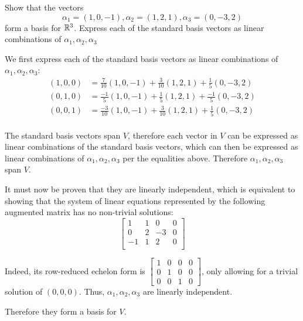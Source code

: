 \documentclass[a4paper, 11pt]{article}
\begin{document}
\begin{problem} 
Show that the vectors \[
    \alpha_1 = (1, 0, -1), \alpha_2 = (1, 2, 1), \alpha_3 = (0, -3, 2)
\]
form a basis for \(\mathbb{R}^3\). Express each of the standard basis vectors as linear combinations of \(\alpha_1, \alpha_2, \alpha_3\)
\end{problem}
\begin{solution}
    We first express each of the standard basis vectors as linear combinations of \(\alpha_1, \alpha_2, \alpha_3\):
    \begin{align*}
        (1, 0, 0) & = \frac{7}{10} (1, 0, -1) + \frac{3}{10} (1, 2, 1) + \frac{1}{5} (0, -3, 2)  \\
        (0, 1, 0) & = \frac{-1}{5} (1, 0, -1) + \frac{1}{5} (1, 2, 1) + \frac{-1}{5} (0, -3, 2)  \\
        (0, 0, 1) & = \frac{-3}{10} (1, 0, -1) + \frac{3}{10} (1, 2, 1) + \frac{1}{5} (0, -3, 2) \\
    \end{align*}

    The standard basis vectors span \(V\), therefore each vector in \(V\) can be expressed as linear combinations of the standard basis vectors, which can then be expressed as linear combinations of \(\alpha_1, \alpha_2, \alpha_3\) per the equalities above. Therefore \(\alpha_1, \alpha_2, \alpha_3\) span \(V\).

    It must now be proven that they are linearly independent, which is equivalent to showing that the system of linear equations represented by the following augmented matrix has no non-trivial solutions:
    \[
        \left[\begin{array}{cccc}
                1  & 1 & 0  & 0 \\
                0  & 2 & -3 & 0 \\
                -1 & 1 & 2  & 0 \\
            \end{array}\right]
    \]

    Indeed, its row-reduced echelon form is \(\left[\begin{array}{cccc}
            1 & 0 & 0 & 0 \\
            0 & 1 & 0 & 0 \\
            0 & 0 & 1 & 0
        \end{array}\right]\), only allowing for a trivial solution of \((0, 0, 0)\). Thus, \(\alpha_1, \alpha_2, \alpha_3\) are linearly independent.

    Therefore they form a basis for \(V\).
\end{solution}
\end{document}
